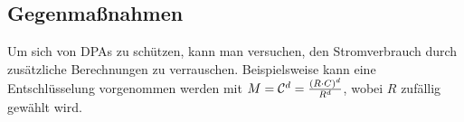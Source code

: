 \subsection{Gegenmaßnahmen}
Um sich von DPAs zu schützen, kann man versuchen, den Stromverbrauch
durch zusätzliche Berechnungen zu verrauschen. Beispielsweise kann eine
Entschlüsselung vorgenommen werden mit $M = \mathcal{C}^d = \frac{(R\cdot
  C)^d}{R^d}$, wobei $R$ zufällig gewählt wird.


